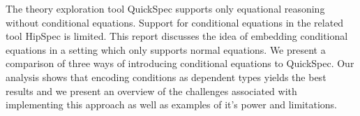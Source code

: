 The theory exploration tool QuickSpec
supports only equational reasoning without
conditional equations. Support for conditional
equations in the related tool HipSpec is limited.
This report discusses the idea of embedding conditional
equations in a setting which only supports normal equations.
We present a comparison of three ways of introducing
conditional equations to QuickSpec.
Our analysis shows that encoding conditions as dependent
types yields the best results and we present an overview of
the challenges associated with implementing
this approach as well as examples
of it's power and limitations.
